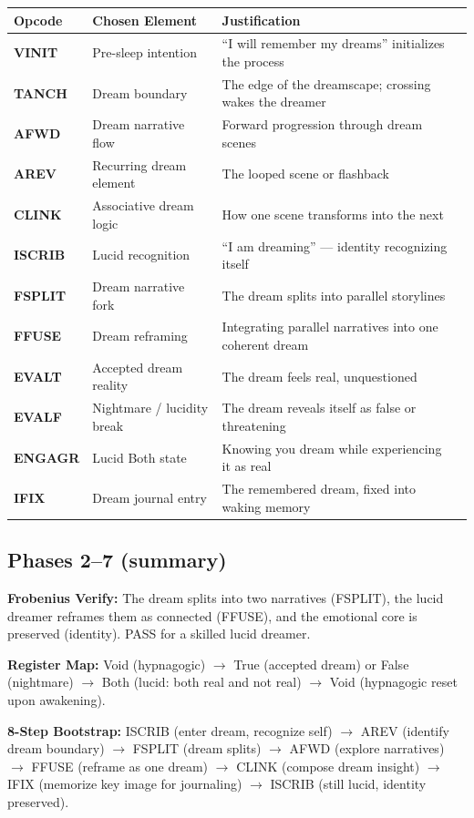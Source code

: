 \documentclass[12pt,a4paper]{article}
\begin{document}
{\small
\begin{tabularx}{\textwidth}{>{\bfseries}p{2cm} p{3.8cm} p{6.2cm}X}
\toprule
{\bf Opcode} & {\bf Chosen Element} & {\bf Justification} \\
\midrule
VINIT & Pre-sleep intention & ``I will remember my dreams'' initializes the process \\
TANCH & Dream boundary & The edge of the dreamscape; crossing wakes the dreamer \\
AFWD & Dream narrative flow & Forward progression through dream scenes \\
AREV & Recurring dream element & The looped scene or flashback \\
CLINK & Associative dream logic & How one scene transforms into the next \\
ISCRIB & Lucid recognition & ``I am dreaming'' — identity recognizing itself \\
FSPLIT & Dream narrative fork & The dream splits into parallel storylines \\
FFUSE & Dream reframing & Integrating parallel narratives into one coherent dream \\
EVALT & Accepted dream reality & The dream feels real, unquestioned \\
EVALF & Nightmare / lucidity break & The dream reveals itself as false or threatening \\
ENGAGR & Lucid Both state & Knowing you dream while experiencing it as real \\
IFIX & Dream journal entry & The remembered dream, fixed into waking memory \\
\bottomrule
\end{tabularx}
}

\subsection*{Phases 2--7 (summary)}

\textbf{Frobenius Verify:} The dream splits into two narratives (FSPLIT), the lucid
dreamer reframes them as connected (FFUSE), and the emotional core is preserved
(identity). PASS for a skilled lucid dreamer.

\textbf{Register Map:} Void (hypnagogic) $\to$ True (accepted dream) or False
(nightmare) $\to$ Both (lucid: both real and not real) $\to$ Void (hypnagogic
reset upon awakening).

\textbf{8-Step Bootstrap:} ISCRIB (enter dream, recognize self) $\to$ AREV (identify
dream boundary) $\to$ FSPLIT (dream splits) $\to$ AFWD (explore narratives) $\to$
FFUSE (reframe as one dream) $\to$ CLINK (compose dream insight) $\to$ IFIX (memorize
key image for journaling) $\to$ ISCRIB (still lucid, identity preserved).
\end{document}
